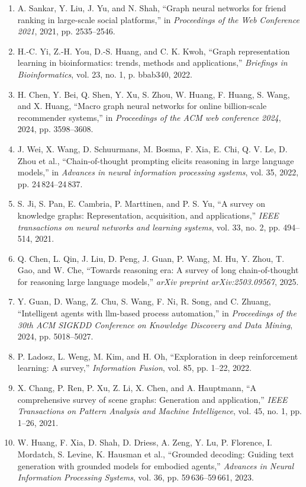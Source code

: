 \documentclass[10pt,UTF8,fontset=fandol]{ctexart}
\begin{document}
\begin{enumerate}[leftmargin=2.4em,labelsep=0.4em,itemsep=0.15em]
\item A. Sankar, Y. Liu, J. Yu, and N. Shah, ``Graph neural networks for friend ranking in large-scale social platforms,'' in \textit{Proceedings of the Web Conference 2021}, 2021, pp. 2535--2546.
\item H.-C. Yi, Z.-H. You, D.-S. Huang, and C. K. Kwoh, ``Graph representation learning in bioinformatics: trends, methods and applications,'' \textit{Briefings in Bioinformatics}, vol. 23, no. 1, p. bbab340, 2022.
\item H. Chen, Y. Bei, Q. Shen, Y. Xu, S. Zhou, W. Huang, F. Huang, S. Wang, and X. Huang, ``Macro graph neural networks for online billion-scale recommender systems,'' in \textit{Proceedings of the ACM web conference 2024}, 2024, pp. 3598--3608.
\item J. Wei, X. Wang, D. Schuurmans, M. Bosma, F. Xia, E. Chi, Q. V. Le, D. Zhou et al., ``Chain-of-thought prompting elicits reasoning in large language models,'' in \textit{Advances in neural information processing systems}, vol. 35, 2022, pp. 24\,824--24\,837.
\item S. Ji, S. Pan, E. Cambria, P. Marttinen, and P. S. Yu, ``A survey on knowledge graphs: Representation, acquisition, and applications,'' \textit{IEEE transactions on neural networks and learning systems}, vol. 33, no. 2, pp. 494--514, 2021.
\item Q. Chen, L. Qin, J. Liu, D. Peng, J. Guan, P. Wang, M. Hu, Y. Zhou, T. Gao, and W. Che, ``Towards reasoning era: A survey of long chain-of-thought for reasoning large language models,'' \textit{arXiv preprint arXiv:2503.09567}, 2025.
\item Y. Guan, D. Wang, Z. Chu, S. Wang, F. Ni, R. Song, and C. Zhuang, ``Intelligent agents with llm-based process automation,'' in \textit{Proceedings of the 30th ACM SIGKDD Conference on Knowledge Discovery and Data Mining}, 2024, pp. 5018--5027.
\item P. Ladosz, L. Weng, M. Kim, and H. Oh, ``Exploration in deep reinforcement learning: A survey,'' \textit{Information Fusion}, vol. 85, pp. 1--22, 2022.
\item X. Chang, P. Ren, P. Xu, Z. Li, X. Chen, and A. Hauptmann, ``A comprehensive survey of scene graphs: Generation and application,'' \textit{IEEE Transactions on Pattern Analysis and Machine Intelligence}, vol. 45, no. 1, pp. 1--26, 2021.
\item W. Huang, F. Xia, D. Shah, D. Driess, A. Zeng, Y. Lu, P. Florence, I. Mordatch, S. Levine, K. Hausman et al., ``Grounded decoding: Guiding text generation with grounded models for embodied agents,'' \textit{Advances in Neural Information Processing Systems}, vol. 36, pp. 59\,636--59\,661, 2023.

\end{enumerate}
\end{document}
